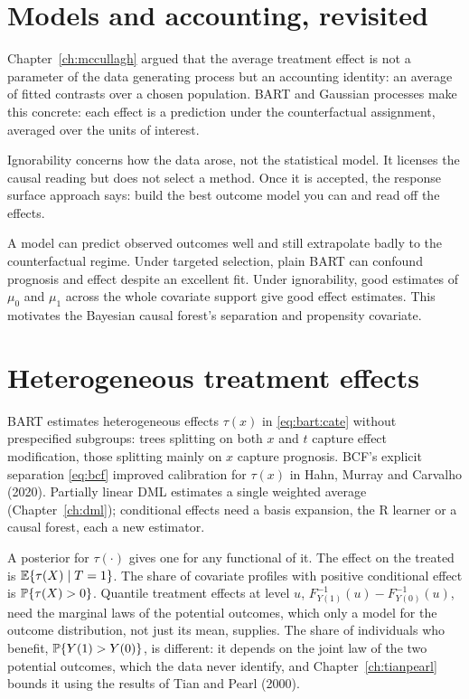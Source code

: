 \section{Models and accounting, revisited}

Chapter~\ref{ch:mccullagh} argued that the average treatment effect is not a parameter of the data generating process but an accounting identity: an average of fitted contrasts over a chosen population. BART and Gaussian processes make this concrete: each effect is a prediction under the counterfactual assignment, averaged over the units of interest.

Ignorability concerns how the data arose, not the statistical model. It licenses the causal reading but does not select a method. Once it is accepted, the response surface approach says: build the best outcome model you can and read off the effects.

\begin{remark}
A model can predict observed outcomes well and still extrapolate badly to the counterfactual regime. Under targeted selection, plain BART can confound prognosis and effect despite an excellent fit. Under ignorability, good estimates of $\mu_0$ and $\mu_1$ across the whole covariate support give good effect estimates. This motivates the Bayesian causal forest's separation and propensity covariate.
\end{remark}

\section{Heterogeneous treatment effects}

BART estimates heterogeneous effects $\tau(x)$ in \eqref{eq:bart:cate} without prespecified subgroups: trees splitting on both $x$ and $t$ capture effect modification, those splitting mainly on $x$ capture prognosis. BCF's explicit separation \eqref{eq:bcf} improved calibration for $\tau(x)$ in Hahn, Murray and Carvalho (2020). Partially linear DML estimates a single weighted average (Chapter~\ref{ch:dml}); conditional effects need a basis expansion, the R learner or a causal forest, each a new estimator.

A posterior for $\tau(\cdot)$ gives one for any functional of it. The effect on the treated is $\mathbb{E}\{\tau(X) \mid T = 1\}$. The share of covariate profiles with positive conditional effect is $\mathbb{P}\{\tau(X) > 0\}$. Quantile treatment effects at level $u$, $F_{Y(1)}^{-1}(u) - F_{Y(0)}^{-1}(u)$, need the marginal laws of the potential outcomes, which only a model for the outcome distribution, not just its mean, supplies. The share of individuals who benefit, $\mathbb{P}\{Y(1) > Y(0)\}$, is different: it depends on the joint law of the two potential outcomes, which the data never identify, and Chapter~\ref{ch:tianpearl} bounds it using the results of Tian and Pearl (2000).

